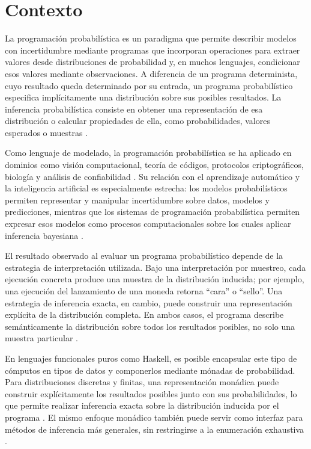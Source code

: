 
\section{Contexto}

La programación probabilística es un paradigma que permite describir modelos con incertidumbre mediante programas que incorporan operaciones para extraer valores desde distribuciones de probabilidad y, en muchos lenguajes, condicionar esos valores mediante observaciones. A diferencia de un programa determinista, cuyo resultado queda determinado por su entrada, un programa probabilístico especifica implícitamente una distribución sobre sus posibles resultados. La inferencia probabilística consiste en obtener una representación de esa distribución o calcular propiedades de ella, como probabilidades, valores esperados o muestras \cite{GordonHNR2014}.

Como lenguaje de modelado, la programación probabilística se ha aplicado en dominios como visión computacional, teoría de códigos, protocolos criptográficos, biología y análisis de confiabilidad \cite{GordonHNR2014}. Su relación con el aprendizaje automático y la inteligencia artificial es especialmente estrecha: los modelos probabilísticos permiten representar y manipular incertidumbre sobre datos, modelos y predicciones, mientras que los sistemas de programación probabilística permiten expresar esos modelos como procesos computacionales sobre los cuales aplicar inferencia bayesiana \cite{Ghahramani2015,ScibiorGG2015}.

El resultado observado al evaluar un programa probabilístico depende de la estrategia de interpretación utilizada. Bajo una interpretación por muestreo, cada ejecución concreta produce una muestra de la distribución inducida; por ejemplo, una ejecución del lanzamiento de una moneda retorna ``cara'' o ``sello''. Una estrategia de inferencia exacta, en cambio, puede construir una representación explícita de la distribución completa. En ambos casos, el programa describe semánticamente la distribución sobre todos los resultados posibles, no solo una muestra particular \cite{GordonHNR2014,ErwigKollmansberger2006}.

En lenguajes funcionales puros como \textsf{Haskell}, es posible encapsular este tipo de cómputos en tipos de datos y componerlos mediante mónadas de probabilidad. Para distribuciones discretas y finitas, una representación monádica puede construir explícitamente los resultados posibles junto con sus probabilidades, lo que permite realizar inferencia exacta sobre la distribución inducida por el programa \cite{ErwigKollmansberger2006}. El mismo enfoque monádico también puede servir como interfaz para métodos de inferencia más generales, sin restringirse a la enumeración exhaustiva \cite{ScibiorGG2015}.

